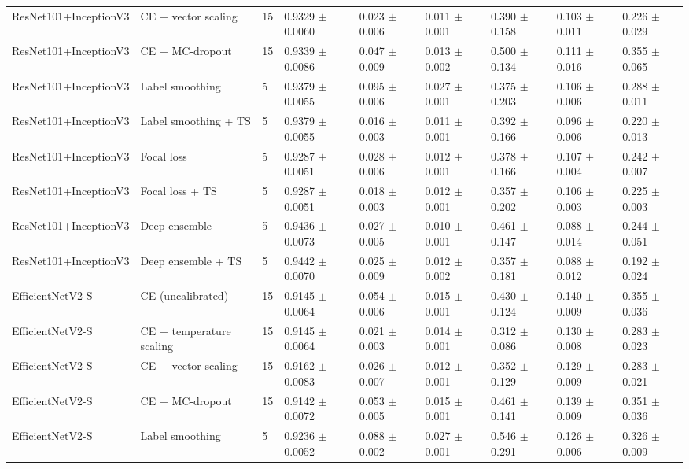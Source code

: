 \begin{table}[ht]
\begin{tabular}{lllllllll}
ResNet101+InceptionV3 & CE + vector scaling & 15 & 0.9329 $\pm$ 0.0060 & 0.023 $\pm$ 0.006 & 0.011 $\pm$ 0.001 & 0.390 $\pm$ 0.158 & 0.103 $\pm$ 0.011 & 0.226 $\pm$ 0.029 \\
ResNet101+InceptionV3 & CE + MC-dropout & 15 & 0.9339 $\pm$ 0.0086 & 0.047 $\pm$ 0.009 & 0.013 $\pm$ 0.002 & 0.500 $\pm$ 0.134 & 0.111 $\pm$ 0.016 & 0.355 $\pm$ 0.065 \\
ResNet101+InceptionV3 & Label smoothing & 5 & 0.9379 $\pm$ 0.0055 & 0.095 $\pm$ 0.006 & 0.027 $\pm$ 0.001 & 0.375 $\pm$ 0.203 & 0.106 $\pm$ 0.006 & 0.288 $\pm$ 0.011 \\
ResNet101+InceptionV3 & Label smoothing + TS & 5 & 0.9379 $\pm$ 0.0055 & 0.016 $\pm$ 0.003 & 0.011 $\pm$ 0.001 & 0.392 $\pm$ 0.166 & 0.096 $\pm$ 0.006 & 0.220 $\pm$ 0.013 \\
ResNet101+InceptionV3 & Focal loss & 5 & 0.9287 $\pm$ 0.0051 & 0.028 $\pm$ 0.006 & 0.012 $\pm$ 0.001 & 0.378 $\pm$ 0.166 & 0.107 $\pm$ 0.004 & 0.242 $\pm$ 0.007 \\
ResNet101+InceptionV3 & Focal loss + TS & 5 & 0.9287 $\pm$ 0.0051 & 0.018 $\pm$ 0.003 & 0.012 $\pm$ 0.001 & 0.357 $\pm$ 0.202 & 0.106 $\pm$ 0.003 & 0.225 $\pm$ 0.003 \\
ResNet101+InceptionV3 & Deep ensemble & 5 & 0.9436 $\pm$ 0.0073 & 0.027 $\pm$ 0.005 & 0.010 $\pm$ 0.001 & 0.461 $\pm$ 0.147 & 0.088 $\pm$ 0.014 & 0.244 $\pm$ 0.051 \\
ResNet101+InceptionV3 & Deep ensemble + TS & 5 & 0.9442 $\pm$ 0.0070 & 0.025 $\pm$ 0.009 & 0.012 $\pm$ 0.002 & 0.357 $\pm$ 0.181 & 0.088 $\pm$ 0.012 & 0.192 $\pm$ 0.024 \\
EfficientNetV2-S & CE (uncalibrated) & 15 & 0.9145 $\pm$ 0.0064 & 0.054 $\pm$ 0.006 & 0.015 $\pm$ 0.001 & 0.430 $\pm$ 0.124 & 0.140 $\pm$ 0.009 & 0.355 $\pm$ 0.036 \\
EfficientNetV2-S & CE + temperature scaling & 15 & 0.9145 $\pm$ 0.0064 & 0.021 $\pm$ 0.003 & 0.014 $\pm$ 0.001 & 0.312 $\pm$ 0.086 & 0.130 $\pm$ 0.008 & 0.283 $\pm$ 0.023 \\
EfficientNetV2-S & CE + vector scaling & 15 & 0.9162 $\pm$ 0.0083 & 0.026 $\pm$ 0.007 & 0.012 $\pm$ 0.001 & 0.352 $\pm$ 0.129 & 0.129 $\pm$ 0.009 & 0.283 $\pm$ 0.021 \\
EfficientNetV2-S & CE + MC-dropout & 15 & 0.9142 $\pm$ 0.0072 & 0.053 $\pm$ 0.005 & 0.015 $\pm$ 0.001 & 0.461 $\pm$ 0.141 & 0.139 $\pm$ 0.009 & 0.351 $\pm$ 0.036 \\
EfficientNetV2-S & Label smoothing & 5 & 0.9236 $\pm$ 0.0052 & 0.088 $\pm$ 0.002 & 0.027 $\pm$ 0.001 & 0.546 $\pm$ 0.291 & 0.126 $\pm$ 0.006 & 0.326 $\pm$ 0.009 \\

\end{tabular}
\end{table}
